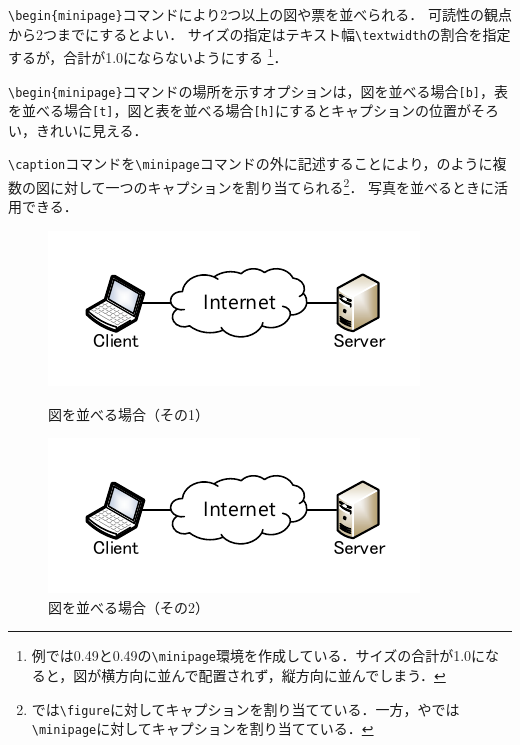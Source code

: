 \documentclass[uplatex]{jsarticle}
\begin{document}
\verb|\begin{minipage}|コマンドにより2つ以上の図や票を並べられる．
可読性の観点から2つまでにするとよい．
サイズの指定はテキスト幅\verb|\textwidth|の割合を指定するが，合計が1.0にならないようにする
\footnote{例では0.49と0.49の\verb|\minipage|環境を作成している．サイズの合計が1.0になると，図が横方向に並んで配置されず，縦方向に並んでしまう．}．

\verb|\begin{minipage}|コマンドの場所を示すオプションは，図を並べる場合\verb|[b]|，表を並べる場合\verb|[t]|，図と表を並べる場合\verb|[h]|にするとキャプションの位置がそろい，きれいに見える．

\verb|\caption|コマンドを\verb|\minipage|コマンドの外に記述することにより，のように複数の図に対して一つのキャプションを割り当てられる\footnote{では\verb|\figure|に対してキャプションを割り当てている．一方，やでは\verb|\minipage|に対してキャプションを割り当てている．}．
写真を並べるときに活用できる．


\begin{figure}[ht]
	\centering
	\begin{minipage}[b]{0.49\textwidth}    %
		\centering
		\includegraphics[width=1 \columnwidth]{fig/figure1.pdf}
		\caption{図を並べる場合（その1）}
		\label{fig:figure1-2-1}
	\end{minipage}
	\begin{minipage}[b]{0.49\textwidth}
		\centering
		\includegraphics[width=1 \columnwidth]{fig/figure1.pdf}
		\caption{図を並べる場合（その2）}
		\label{fig:figure1-2-2}
	\end{minipage}
\end{figure}
\end{document}

